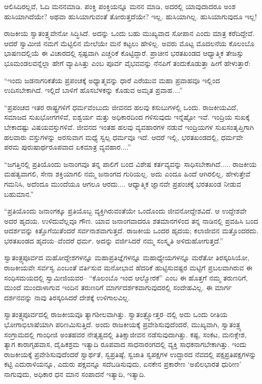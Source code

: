 ಆಲಿಸಿದಿರಲ್ಲವೆ, ಓದಿ ಮನನಮಾಡಿ. ಪಂಕ್ತಿ ಪಂಕ್ತಿಯನ್ನೂ ಮನನ ಮಾಡಿ, ಅದರಲ್ಲಿ ಯಾವುದಾದರೂ ಅಂಶ ಹುಸಿಯಾಗಿದೆಯೇ? ಅಥವಾ ಹುಸಿಯಾಗುವಂತೆ ತೋರುತ್ತದೆಯೇ? ಇಲ್ಲ. ಹುಸಿಯಾಗಿಲ್ಲ. ಹುಸಿಯಾಗುವುದೂ ಇಲ್ಲ!

ರಾಜಕೀಯ ಸ್ವಾತಂತ್ರ್ಯವೇನೋ ಸಿದ್ಧಿಸಿದೆ. ಅದನ್ನು ಒಂದು ಬಹು ಮುಖ್ಯವಾದ ಸೋಪಾನ ಎಂದು ಮಾತ್ರ ಕರೆದಿದ್ದೇವೆ. ಆದರೆ ಸ್ವಾಮೀಜಿ ನಮಗೆ ಮೆಟ್ಟಿಲಿನ ಮೇಲೆಯೇ ಮನೆ ಕಟ್ಟಲು ಹೇಳಿಲ್ಲ. ಅವರು ಮೊಟ್ಟ ಮೊದಲನೆಯ ಕೊಲಂಬೊ ಭಾಷಣದಲ್ಲಿಯೆ ಈ ವಿಚಾರದಲ್ಲಿ ಸ್ಪಷ್ಟವಾಗಿ ಎಚ್ಚರಿಕೆ ಕೊಟ್ಟಿದ್ದಾರೆ. ಪ್ರಾಚೀನ ಭರತಖಂಡದ ಆಧ್ಯಾತ್ಮಿಕ ತೇಜಸ್ಸು ಭೂಮಂಡಲವನ್ನೆಲ್ಲಾ ಹೇಗೆ ವ್ಯಾಪಿಸಿತ್ತು ಎಂಬ ಪೂರ್ವ ವೈಭವವನ್ನು ನೆನಪಿಗೆ ತಂದುಕೊಡುತ್ತಾ ಹೀಗೆ ಹೇಳುತ್ತಾರೆ:

“ಇಂದು ಜಡನಾಗರಿಕತೆಯ ಪ್ರಪಂಚಕ್ಕೆ ಅಧ್ಯಾತ್ಮವನ್ನು ಧಾರೆ ಎರೆಯುವ ಮಹಾ ಪ್ರವಾಹವೂ ಇಲ್ಲಿಂದ ಉದಿಸಬೇಕಾಗಿದೆ. ಇಲ್ಲಿದೆ ಬಾಳಿಗೆ ಹೊಸಬೆಳಕನ್ನು ಕೊಡುವ ಅಮೃತ ಪ್ರವಾಹ....”

“ಪ್ರಪಂಚದ ಇತರ ರಾಷ್ಟ್ರಗಳಿಗೆ ಧರ್ಮವೆಂಬುದು ಜೀವನದ ಹಲವು ಕಸುಬುಗಳಲ್ಲಿ ಒಂದು. ರಾಜಕೀಯವಿದೆ, ಸಮಾಜದ ಸುಖಭೋಗಗಳಿವೆ, ಐಶ್ವರ್ಯ ಮತ್ತು ಅಧಿಕಾರದಿಂದ ಗಳಿಸುವುದು ಇನ್ನೆಷ್ಟೋ ಇವೆ. ಇಂದ್ರಿಯ ಸುಖಕ್ಕೆ ಬೇಕಾದಷ್ಟು ವಿಷಯವಸ್ತುಗಳಿವೆ. ಜೀವನದ ಇಂತಹ ಹಲವು ವ್ಯವಹಾರಗಳ ನಡುವೆ ಇಂದ್ರಿಯಗಳ ಸುಖಸಂತೃಪ್ತಿಗಾಗಿ ಹಲವಾರು ವಸ್ತುಗಳನ್ನು ಅರಸುವಾಗ ಮಧ್ಯೆ ಸ್ವಲ್ಪ ಧರ್ಮವೂ ಇದೆ. ಆದರೆ ಇಲ್ಲಿ, ಭರತಖಂಡದಲ್ಲಿ, ಧರ್ಮವೇ ಪರಮ ಪುರುಷಾರ್ಥರೂಪವಾದ ಏಕಮಾತ್ರ ವ್ಯವಹಾರ....”

“ಜಗತ್ತಿನಲ್ಲಿ ಪ್ರತಿಯೊಂದು ಜನಾಂಗವೂ ತನ್ನ ಪಾಲಿಗೆ ಬಂದ ವಿಶೇಷ ಕರ್ತವ್ಯವನ್ನು ಸಾಧಿಸಬೇಕಾಗಿದೆ..... ರಾಜಕೀಯ ಮಹತ್ವವಾಗಲಿ, ಸೇನಾ ಶಕ್ತಿಯಾಗಲಿ ನಮ್ಮ ಜನಾಂಗದ ಗುರಿಯಲ್ಲ. ಅದು ಎಂದೂ ಹಿಂದೆ ಆಗಿರಲಿಲ್ಲ, ಹೇಳುತ್ತೇವೆ ಗಮನಿಸಿ, ಅದೆಂದೂ ಮುಂದೆಯೂ ಆಗಲೂ ಆರದು.... ಆಧ್ಯಾತ್ಮಿಕ ಜ್ಞಾನವೇ ಪ್ರಪಂಚಕ್ಕೆ ಭರತಖಂಡ ನೀಡುವ ಬಹುಮಾನ.”

“ಪ್ರತಿಯೊಂದು ಜನಾಂಗಕ್ಕೂ ಪ್ರತಿಯೊಬ್ಬ ವ್ಯಕ್ತಿಗಿರುವಂತೆಯೇ ಒಂದೊಂದು ಜೀವನೋದ್ದೇಶವಿದೆ. ಆ ಉದ್ದೇಶವೇ ಅದರ ಹೃದಯ. ಉಳಿದುವೆಲ್ಲವೂ ಗೌಣ. ಯಾವ ಜನಾಂಗವಾದರೂ ಶತಮಾನಗಳಿಂದ ತನ್ನ ನಾಡಿನಲ್ಲಿ ಪ್ರವಹಿಸಿ ಬಂದ ಆದರ್ಶವನ್ನು ಕಿತ್ತೊಗೆಯಿತೆಂದರೆ ಸರ್ವನಾಶವಾಗುತ್ತದೆ. ರಾಜಕೀಯ ಒಂದರ ಹೃದಯ; ಕಲಾಜೀವನ ಮತ್ತೊಂದರದು. ಭರತಖಂಡದ ಹೃದಯ–ವೆಂದರೆ ಧರ್ಮ. ಅದನ್ನು ವರ್ಜಿಸಿದರೆ ನಮ್ಮ ಸಂಸ್ಕೃತಿ ಅಳಿದುಹೋಗುತ್ತದೆ.”

ಸ್ವಾತಂತ್ರ್ಯಪೂರ್ವದ ಮಹೋದ್ದೇಶಗಳನ್ನೂ ಮಹಾಪ್ರತಿಜ್ಞೆಗಳನ್ನೂ ಮಹಾಧ್ಯೇಯಗಳನ್ನೂ ಮರೆತೋ ತಿರಸ್ಕರಿಸಿಯೋ, ರಾಜಕೀಯವೇ ಸರ್ವಸ್ವ ಎಂಬಂತೆ ವರ್ತಿಸುವ ಮನೋಭಾವ ಹೆದರಿಕೆ ಹುಟ್ಟಿಸುವಷ್ಟರ ಮಟ್ಟಿಗೆ ಪ್ರಬಲವಾಗಿರುವ ಈ ಸಂಧಿಸಮಯದಲ್ಲಿ ಸ್ವಾಮೀಜಿಯವರ– “ಕೊಲಂಬೊ ಇಂದ ಆಲ್ಮೋರಕೆ” ಎಂಬ ಈ ಹೊತ್ತಗೆ ನಮ್ಮ ತರುಣರಿಗೆ, ಮುಂದೆ ಮುಂದಾಳಾಗುವ ಇಂದಿನ ತರುಣರಿಗೆ ಮಾರ್ಗದರ್ಶಕವಾಗುವುದರಲ್ಲಿ ಸಂದೇಹವಿಲ್ಲ. ಈ ಮಾರ್ಗ ದರ್ಶನವನ್ನು ನಾವು ತಿರಸ್ಕರಿಸಿದರೆ ದೇಶಕ್ಕೆ ಉಳಿಗಾಲವಿಲ್ಲ.

ಸ್ವಾತಂತ್ರ್ಯಪೂರ್ವದಲ್ಲಿ ರಾಜಕೀಯವೂ ತ್ಯಾಗಶೀಲವಾಗಿತ್ತು. ಸ್ವಾತಂತ್ರ್ಯೋತ್ತರ–ದಲ್ಲಿ ಅದು ಒಂದು ರೀತಿಯ ಭೋಗಾಭಿಲಾಷೆಯಾಗಿ ಪರಿಣಮಿಸುತ್ತಿದೆ. ಅಂದು ರಾಜಕೀಯಕ್ಕೆ ಪ್ರವೇಶಿಸುವುದೆಂದರೆ, ಮುಖ್ಯವಾಗಿ, ಸ್ವಾತಂತ್ರ್ಯ ಸಂಗ್ರಾಮದಲ್ಲಿ ಗಾಂಧೀಜಿ ಅಂತಹವರ ನೇತೃತ್ವದಲ್ಲಿ ತಿತಿಕ್ಷಾಜೀವನ ನಡೆಸುವುದಾಗಿತ್ತು. ಕಷ್ಟ, ಸಂಕಟ, ಮನಃಕ್ಲೇಶ, ತ್ಯಾಗ ಕಾರಾಗೃಹವಾಸ, ದೈಹಿಕಶ್ರಮ ಇತ್ಯಾದಿ ರೂಪವಾದ ಸಾಧನಾರಂಗದಲ್ಲಿ ವ್ಯಕ್ತಿ ಸಾಧಕನಾಗಬೇಕಾಗಿತ್ತು. ಇಂದು ರಾಜಕೀಯಕ್ಕೆ ಪ್ರವೇಶಿಸುವುದೆಂದರೆ ಸ್ವಾರ್ಥತೆ, ಸ್ವಪ್ರತಿಷ್ಠೆ, ಸ್ವಜಾತಿ ಸ್ವಪಕ್ಷಗಳ ಉದ್ಧಾರದ ನೆವದಲ್ಲಿ ಪಕ್ಷಪ್ರತಿಪಕ್ಷಗಳನ್ನು ಕಟ್ಟಿ ಎದುರಾಳಿಯನ್ನೂ, ಎದುರು ಪಕ್ಷವನ್ನೂ ಸದೆಬಡಿಸುವುದು, ಏನಕೇನ ಪ್ರಕಾರೇಣ ‘ಅಖಿಲಭಾರತ ಧುರೀಣ’ ನಾಗುವುದು, ಅಧಿಕಾರ ಧನ ಮಾನ ಸಂಪಾದನೆ ಇತ್ಯಾದಿ, ಇತ್ಯಾದಿ.

